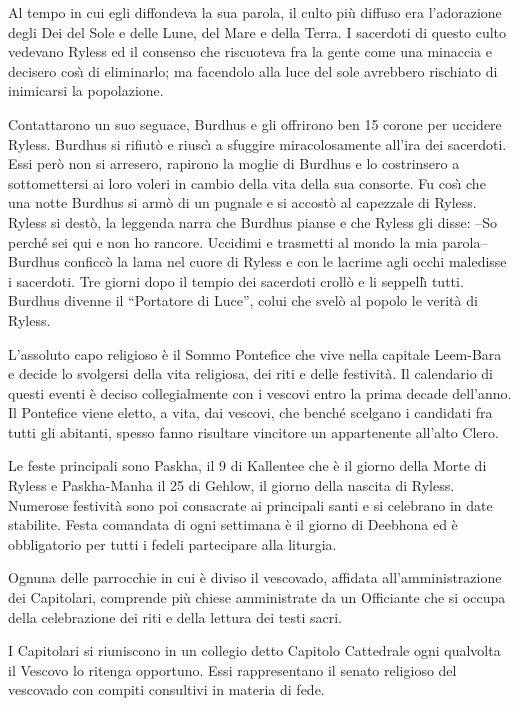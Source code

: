 
Al tempo in cui egli diffondeva la sua parola, il culto pi\`u diffuso
era l'adorazione degli Dei del Sole e delle Lune, del Mare e della
Terra.  I sacerdoti di questo culto vedevano Ryless ed il consenso che
riscuoteva fra la gente come una minaccia e decisero cos\`{\i}  di
eliminarlo; ma facendolo alla luce del sole avrebbero rischiato di
inimicarsi la popolazione.

Contattarono un suo seguace, Burdhus e gli offrirono ben 15 corone per
uccidere Ryless. Burdhus si rifiut\`o e riusc\`{\i} a sfuggire
miracolosamente all'ira dei sacerdoti.  Essi per\`o non si arresero,
rapirono la moglie di Burdhus e lo costrinsero a sottomettersi ai loro
voleri in cambio della vita della sua consorte. Fu cos\`{\i}  che una
notte Burdhus si arm\`o di un pugnale e si accost\`o al capezzale di
Ryless.  Ryless si dest\`o, la leggenda narra che Burdhus pianse e che
Ryless gli disse: --So perch\'e sei qui e non ho rancore. Uccidimi e
trasmetti al mondo la mia parola--  Burdhus conficc\`o la lama nel
cuore di Ryless e con le lacrime agli occhi maledisse i sacerdoti. Tre
giorni dopo il tempio dei sacerdoti croll\`o e li seppell\`{\i} tutti.
Burdhus divenne il ``Portatore di Luce'', colui che svel\`o al popolo
le verit\`a di Ryless.

L'assoluto capo religioso \`e il Sommo Pontefice che vive nella
capitale Leem-Bara e decide lo svolgersi della vita religiosa, dei
riti e delle festivit\`a. Il calendario di questi eventi \`e deciso
collegialmente con i vescovi entro la prima decade dell'anno.  Il
Pontefice viene eletto, a vita, dai vescovi, che bench\'e scelgano i
candidati fra tutti gli abitanti, spesso fanno risultare vincitore un
appartenente all'alto Clero.

Le feste principali sono Paskha, il 9 di Kallentee che \`e il giorno
della Morte di Ryless e Paskha-Manha il 25 di Gehlow, il giorno della
nascita di Ryless. Numerose festivit\`a sono poi consacrate ai
principali santi e si celebrano in date stabilite.
Festa comandata di ogni settimana \`e il giorno di Deebhona ed \`e
obbligatorio per tutti i fedeli partecipare alla liturgia.

Ognuna delle parrocchie in cui \`e diviso il vescovado, affidata
all'amministrazione dei Capitolari, comprende pi\`u chiese
amministrate da un Officiante che si occupa della celebrazione dei
riti e della lettura dei testi sacri. 

I Capitolari si riuniscono in un collegio detto Capitolo Cattedrale
ogni qualvolta il Vescovo lo ritenga opportuno. Essi rappresentano il
senato religioso del vescovado con compiti consultivi in materia di
fede.

